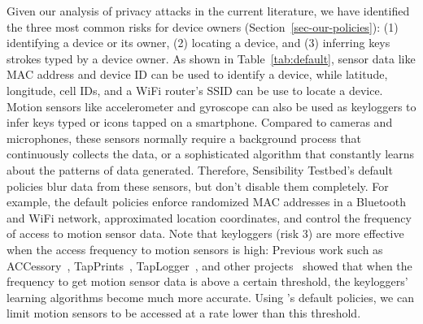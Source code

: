 Given our analysis of privacy attacks in the current literature, 
we have identified the three 
most common 
risks for device owners (Section~\ref{sec-our-policies}): (1) identifying a device or its owner, 
(2) locating a device, and (3) inferring keys strokes typed by a device owner. 
As shown in Table~\ref{tab:default}, 
sensor data like MAC address and device ID can be used to identify a device, while latitude, longitude, cell 
IDs, and a WiFi router's SSID can be use to locate a 
device. Motion sensors like accelerometer and gyroscope can also be used
as keyloggers to infer keys typed or icons tapped on a 
smartphone. Compared to cameras and microphones, these 
sensors normally require a background process that continuously 
collects the data, or a sophisticated algorithm that constantly learns 
about the patterns of data generated. 
Therefore, Sensibility Testbed's default policies 
blur data from these sensors, but don't disable them completely. 
For example, the default policies enforce randomized MAC addresses in a 
Bluetooth and WiFi network, approximated location coordinates, and 
control the frequency of access to motion sensor data. Note that keyloggers (risk 3)
are more effective when the access frequency to motion sensors is 
high: Previous work such as ACCessory~\cite{owusu2012accessory}, 
TapPrints~\cite{miluzzo2012tapprints}, TapLogger~\cite{xu2012taplogger}, 
and other projects~\cite{aviv2012practicality} showed that when the 
frequency to get motion sensor data is above a certain threshold, the keyloggers' 
learning algorithms become much more accurate.  
Using \sysname's default policies, we can limit 
motion sensors to be accessed at a rate lower than this threshold. 




